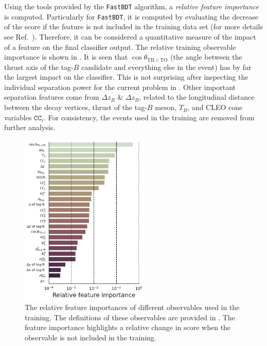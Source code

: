 Using the tools provided by the \texttt{FastBDT} algorithm, a \textit{relative feature importance} is computed.
Particularly for \texttt{FastBDT}, it is computed by evaluating the decrease of the \AUC score if the feature is not included in the training data set (for more details see Ref.~\cite{Keck:2017gsv}).
Therefore, it can be considered a quantitative measure of the impact of a feature on the final classifier output.
The relative training observable importance is shown in . 
It is seen that $\cos\theta_{\mathrm{TB}\wedge\mathrm{TO}}$ (the angle between the thrust axis of the tag-$B$ candidate and everything else in the event) has by far the largest impact on the classifier.
This is not surprising after inspecting the individual separation power for the current problem in .
Other important separation features come from  $\Delta z_B$ \&  $\Delta z_B$, related to the longitudinal distance between the decay vertices,
thrust of the tag-$B$ meson, $T_B$, and CLEO cone variables $\mathtt{CC}_i$. 
For consistency, the events used in the training are removed from further analysis.

\begin{figure}[hbtp!]
    \centering
    \includegraphics[width=0.55\textwidth]{figures/continuum_suppression/feature_importance.pdf}
    \caption{\label{fig:feature_importance} The relative feature importances of different observables used in the training.
    The definitions of these observables are provided in .
    The feature importance highlights a relative change in \AUC score when the observable is not included in the training.
    }
\end{figure}

